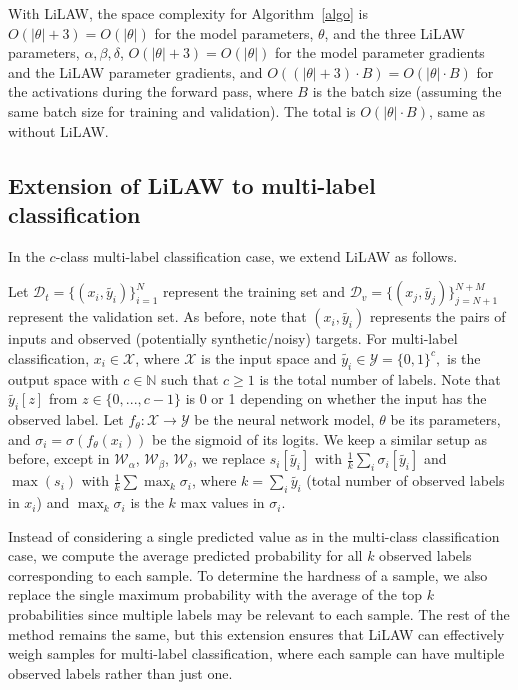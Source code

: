\documentclass{article}
\theoremstyle{plain}
\theoremstyle{definition}
\theoremstyle{remark}
\begin{document}
With LiLAW, the space complexity for Algorithm~\ref{algo} is $O(|\theta| + 3) = O(|\theta|)$ for the model parameters, $\theta$, and the three LiLAW parameters, $\alpha, \beta, \delta$, $O(|\theta| + 3) = O(|\theta|)$ for the model parameter gradients and the LiLAW parameter gradients, and $O((|\theta| + 3) \cdot B) = O(|\theta| \cdot B)$ for the activations during the forward pass, where $B$ is the batch size (assuming the same batch size for training and validation). The total is $O(|\theta| \cdot B)$, same as without LiLAW.

\subsection{Extension of LiLAW to multi-label classification}
\label{sec:multilabel}
In the $c$-class multi-label classification case, we extend LiLAW as follows.

Let $\mathcal{D}_{t} = \{(x_i, \widetilde{y_i})\}^N_{i=1}$ represent the training set and $\mathcal{D}_{v} = \{(x_j, \widetilde{y_j})\}^{N+M}_{j=N+1}$ represent the validation set. As before, note that $(x_i, \widetilde{y_i})$ represents the pairs of inputs and observed (potentially synthetic/noisy) targets. For multi-label classification, $x_i \in \mathcal{X}$, where $\mathcal{X}$ is the input space and $\widetilde{y_i} \in \mathcal{Y} = \{0,1\}^c,$ is the output space with $c \in \mathbb{N}$ such that $c \ge 1$ is the total number of labels. Note that $\widetilde{y_i}[z]$ from $z \in \{0,...,c-1\}$ is 0 or 1 depending on whether the input has the observed label. Let $f_{\theta}: \mathcal{X} \rightarrow \mathcal{Y}$ be the neural network model, $\theta$ be its parameters, and $\sigma_i = \sigma(f_{\theta}(x_i))$ be the sigmoid of its logits. We keep a similar setup as before, except in $\mathcal{W}_\alpha$, $\mathcal{W}_\beta$, $\mathcal{W}_\delta$, we replace $s_i[\widetilde{y_i}]$ with $\frac{1}{k}\sum_i \sigma_i[\widetilde{y_i}]$ and $\max(s_i)$ with $\frac{1}{k}\sum\max_k{\sigma_i}$, where $k=\sum_i \widetilde{y_i}$ (total number of observed labels in $x_i$) and $\max_k{\sigma_i}$ is the $k$ max values in $\sigma_i$.

Instead of considering a single predicted value as in the multi-class classification case, we compute the average predicted probability for all $k$ observed labels corresponding to each sample. To determine the hardness of a sample, we also replace the single maximum probability with the average of the top $k$ probabilities since multiple labels may be relevant to each sample. The rest of the method remains the same, but this extension ensures that LiLAW can effectively weigh samples for multi-label classification, where each sample can have multiple observed labels rather than just one.
\end{document}
